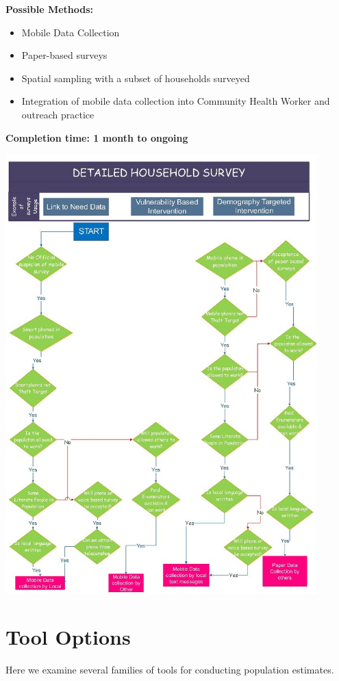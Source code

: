 \documentclass[a4paper,12pt,twoside]{article}
\begin{document}
\noindent
\textbf{Possible Methods:}
\begin{itemize}
    \item Mobile Data Collection
    \item Paper-based surveys
    \item Spatial sampling with a subset of households surveyed
    \item Integration of mobile data collection into Community Health Worker and outreach practice
\end{itemize}

\noindent
\textbf{Completion time: 1 month to ongoing}

\includegraphics[width=0.9\textwidth]{images/Detailed_Household_Survey.jpeg}

\section{Tool Options}
Here we examine several families of tools for conducting population estimates. 
\end{document}
